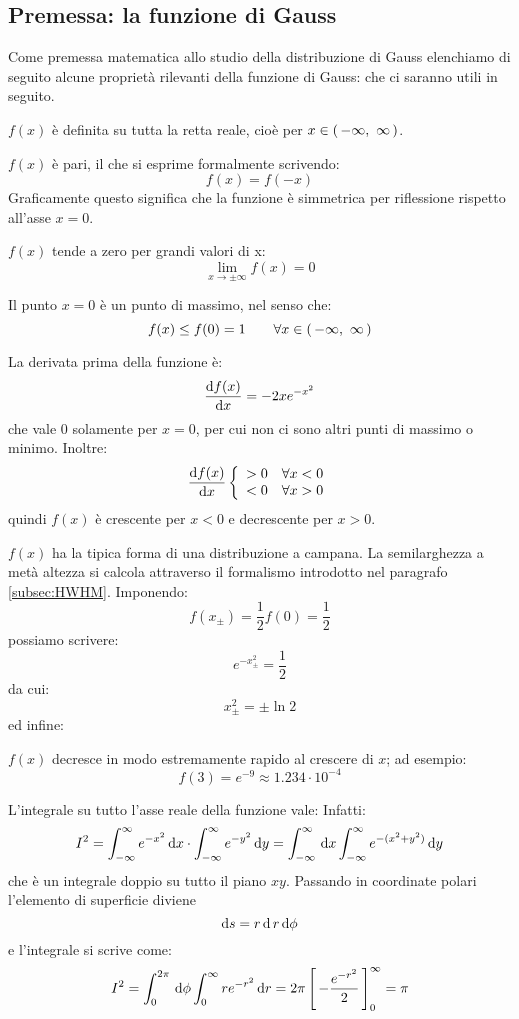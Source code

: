 \subsection{Premessa: la funzione di Gauss}

Come premessa matematica allo studio della distribuzione di Gauss
elenchiamo di seguito alcune propriet\`a rilevanti della funzione
di Gauss:
che ci saranno utili in seguito.
\begin{numlist}
\item{
$f(x)$ \`e definita su tutta la retta reale, cio\`e per
$x \in \ointerval{-\infty}{\infty}$.
}
\item{
$f(x)$ \`e pari, il che si esprime formalmente scrivendo:
$$
f(x) = f(-x)
$$
Graficamente questo significa che la funzione \`e simmetrica per
riflessione rispetto all'asse $x = 0$.
}
\item{
$f(x)$ tende a zero per grandi valori di x:
$$
\lim_{x\to\pm\infty} f(x) = 0
$$
}
\item{
Il punto $x = 0$ \`e un punto di massimo, nel senso che:
$$
f(x) \le f(0) = 1 \qquad \forall x \in \ointerval{-\infty}{\infty}
$$
}
\item{
La derivata prima della funzione \`e:
$$
\tfder{f(x)}{x} =-2x e^{-x^2}
$$
che vale 0 solamente per $x=0$, per cui non ci sono altri
punti di massimo o minimo.
Inoltre:
$$
\tfder{f(x)}{x} \left \{ \begin{array}{ll}
> 0 & \forall x < 0\\
< 0 & \forall x >0
\end{array} \right.
$$
quindi $f(x)$ \`e crescente per $x < 0$ e decrescente per $x > 0$.
}
\item{
$f(x)$ ha la tipica forma di una distribuzione a campana.
La semilarghezza a met\`a altezza si calcola attraverso il formalismo
introdotto nel paragrafo \ref{subsec:HWHM}. Imponendo:
$$
f(x_{\pm}) =\frac{1}{2} f(0) = \frac{1}{2}
$$
possiamo scrivere:
$$
e^{-x_{\pm}^2}=\frac{1}{2}
$$
da cui:
$$
x_{\pm}^2=\pm \ln 2
$$
ed infine:
}
\item{
$f(x)$ decresce in modo estremamente rapido al crescere di $x$; ad esempio:
$$
f(3)=e^{-9} \approx 1.234 \cdot 10^{-4}
$$
}
\item{
L'integrale su tutto l'asse reale della funzione vale:
Infatti:
$$
I^2 =
\dintegral{e^{-x^2}}{x}{-\infty}{\infty} \cdot
\dintegral{e^{-y^2}}{y}{-\infty}{\infty} =
\dintegral{}{x}{-\infty}{\infty}
\dintegral{e^{-(x^2+y^2)}}{y}{-\infty}{\infty}
$$
che \`e un integrale doppio su tutto il piano $x y$. Passando in coordinate
polari l'elemento di superficie diviene
$$
\ud s = r \, \ud \,r \, \ud \phi
$$
e l'integrale si scrive come:
$$
I^2 = \dintegral{}{\phi}{0}{2\pi} \dintegral{re^{-r^2}}{r}{0}{\infty} =
2\pi \eval{-\frac{e^{-r^2}}{2}}{0}{\infty} = \pi
$$
}
\end{numlist}

